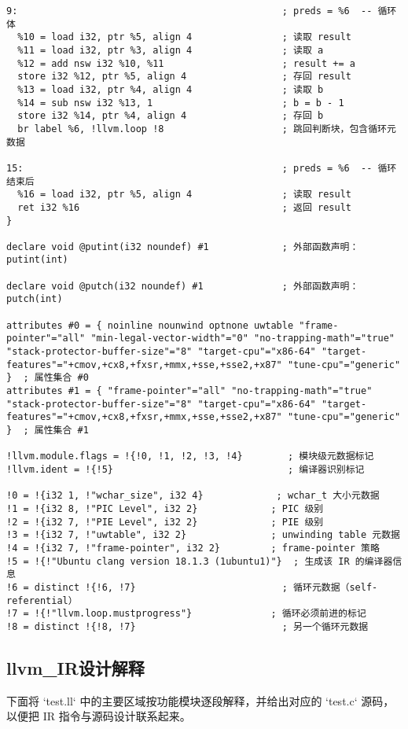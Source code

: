 \documentclass[a4paper]{article}
\begin{document}
\begin{lstlisting}[language=text,caption={test.ll}]
9:                                               ; preds = %6  -- 循环体
  %10 = load i32, ptr %5, align 4                ; 读取 result
  %11 = load i32, ptr %3, align 4                ; 读取 a
  %12 = add nsw i32 %10, %11                     ; result += a
  store i32 %12, ptr %5, align 4                 ; 存回 result
  %13 = load i32, ptr %4, align 4                ; 读取 b
  %14 = sub nsw i32 %13, 1                       ; b = b - 1
  store i32 %14, ptr %4, align 4                 ; 存回 b
  br label %6, !llvm.loop !8                     ; 跳回判断块，包含循环元数据

15:                                              ; preds = %6  -- 循环结束后
  %16 = load i32, ptr %5, align 4                ; 读取 result
  ret i32 %16                                    ; 返回 result
}

declare void @putint(i32 noundef) #1             ; 外部函数声明：putint(int)

declare void @putch(i32 noundef) #1              ; 外部函数声明：putch(int)

attributes #0 = { noinline nounwind optnone uwtable "frame-pointer"="all" "min-legal-vector-width"="0" "no-trapping-math"="true" "stack-protector-buffer-size"="8" "target-cpu"="x86-64" "target-features"="+cmov,+cx8,+fxsr,+mmx,+sse,+sse2,+x87" "tune-cpu"="generic" }  ; 属性集合 #0
attributes #1 = { "frame-pointer"="all" "no-trapping-math"="true" "stack-protector-buffer-size"="8" "target-cpu"="x86-64" "target-features"="+cmov,+cx8,+fxsr,+mmx,+sse,+sse2,+x87" "tune-cpu"="generic" }  ; 属性集合 #1

!llvm.module.flags = !{!0, !1, !2, !3, !4}        ; 模块级元数据标记
!llvm.ident = !{!5}                               ; 编译器识别标记

!0 = !{i32 1, !"wchar_size", i32 4}             ; wchar_t 大小元数据
!1 = !{i32 8, !"PIC Level", i32 2}             ; PIC 级别
!2 = !{i32 7, !"PIE Level", i32 2}             ; PIE 级别
!3 = !{i32 7, !"uwtable", i32 2}               ; unwinding table 元数据
!4 = !{i32 7, !"frame-pointer", i32 2}         ; frame-pointer 策略
!5 = !{!"Ubuntu clang version 18.1.3 (1ubuntu1)"}  ; 生成该 IR 的编译器信息
!6 = distinct !{!6, !7}                          ; 循环元数据（self-referential）
!7 = !{!"llvm.loop.mustprogress"}              ; 循环必须前进的标记
!8 = distinct !{!8, !7}                          ; 另一个循环元数据

\end{lstlisting}

\subsection{llvm\_IR设计解释}
下面将 `test.ll` 中的主要区域按功能模块逐段解释，并给出对应的 `test.c` 源码，以便把 IR 指令与源码设计联系起来。
\end{document}
